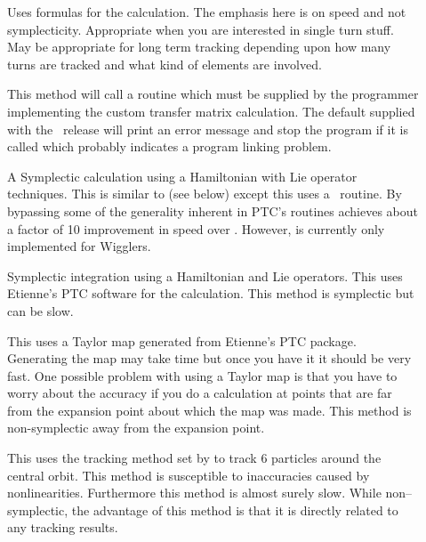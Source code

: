 \begin{description}

\item[]
Uses formulas for the calculation. The emphasis here is on speed and not
symplecticity. Appropriate when you are interested in single turn
stuff. May be appropriate for long term tracking depending upon how
many turns are tracked and what kind of elements are involved. 

\item[]
This method will call a routine  which must be
supplied by the programmer implementing the custom transfer matrix
calculation. The default  supplied with the
\bmad\ release will print an error message and stop the program if it
is called which probably indicates a program linking problem.

\item[]
A Symplectic calculation using a Hamiltonian with Lie operator techniques.
This is similar to  (see below) except this uses a
\bmad\ routine. By bypassing some of the generality inherent in PTC's routines
 achieves about a factor of 10 improvement in speed over
. However,  is
currently only implemented for Wigglers.

\item[]
Symplectic integration using a Hamiltonian and Lie operators.
This uses Etienne's PTC software for the calculation.
This method is symplectic but can be slow.

\item[]
This uses a Taylor map generated from Etienne's PTC
package. Generating the map may take time but once you have it it
should be very fast. One possible problem with using a Taylor map is
that you have to worry about the accuracy if you do a calculation at points
that are far from the expansion point about which the map was
made. This method is non-symplectic away from the expansion point. 

\item[]
This uses the tracking method set by  to track 6
particles around the central orbit. This method is susceptible to inaccuracies
caused by nonlinearities. Furthermore this method
is almost surely slow. While non--symplectic, the advantage of this method
is that it is directly related to any tracking results.

\end{description}

